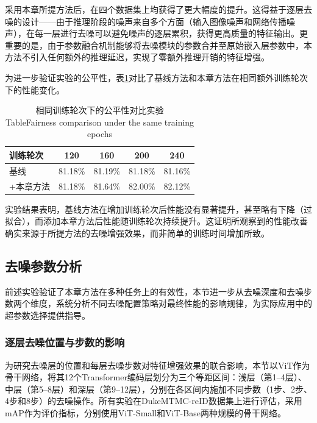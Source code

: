 采用本章所提方法后，在四个数据集上均获得了更大幅度的提升。这得益于逐层去噪的设计——由于推理阶段的噪声来自多个方面（输入图像噪声和网络传播噪声），在每一层进行去噪可以避免噪声的逐层累积，获得更高质量的特征输出。更重要的是，由于参数融合机制能够将去噪模块的参数合并至原始嵌入层参数中，本方法不引入任何额外的推理延迟，实现了零额外推理开销的特征增强。

为进一步验证实验的公平性，表\ref{tab:chap3_fairness}对比了基线方法和本章方法在相同额外训练轮次下的性能变化。

\begin{table}[htbp]
\centering
\caption{相同训练轮次下的公平性对比实验\protect\\[-2pt]{\rm Table\;\thetable\quad Fairness comparison under the same training epochs}}\label{tab:chap3_fairness}
\vspace{0.2cm}
\renewcommand{\arraystretch}{1.15}
\begin{tabular}{lcccc}
\hline \hline
训练轮次 & 120 & 160 & 200 & 240 \\
\hline
基线 & 81.18\% & 81.19\% & 81.18\% & 81.16\% \\
+本章方法 & 81.18\% & 81.64\% & 82.00\% & 82.12\% \\
\hline \hline
\end{tabular}
\end{table}

实验结果表明，基线方法在增加训练轮次后性能没有显著提升，甚至略有下降（过拟合），而添加本章方法后性能随训练轮次持续提升。这证明所观察到的性能改善确实来源于所提方法的去噪增强效果，而非简单的训练时间增加所致。

\subsection{去噪参数分析}

前述实验验证了本章方法在多种任务上的有效性，本节进一步从去噪深度和去噪步数两个维度，系统分析不同去噪配置策略对最终性能的影响规律，为实际应用中的超参数选择提供指导。

\subsubsection{逐层去噪位置与步数的影响}

为研究去噪层的位置和每层去噪步数对特征增强效果的联合影响，本节以ViT作为骨干网络，将其12个Transformer编码层划分为三个等距区间：浅层（第1--4层）、中层（第5--8层）和深层（第9--12层），分别在各区间内施加不同步数（1步、2步、4步和8步）的去噪操作。所有实验在DukeMTMC-reID数据集上进行评估，采用mAP作为评价指标，分别使用ViT-Small和ViT-Base两种规模的骨干网络。


